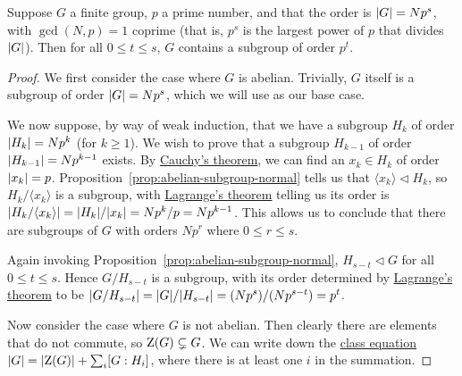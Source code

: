 \begin{theorem}\label{thm:sylow-1}
    Suppose \(G\) a finite group, \(p\) a prime number,
    and that the order is \(\abs{G} = Np^s\),
    with \(\gcd(N,p) = 1\) coprime
    (that is, \(p^s\) is the largest power of \(p\) that divides \(\abs{G}\)).
    Then for all \(0 \leq t \leq s\),
    \(G\) contains a subgroup of order \(p^t\).
\end{theorem}
\begin{proof}
    We first consider the case where \(G\) is abelian.
    Trivially, \(G\) itself is a subgroup of order \(\abs{G} = Np^s\),
    which we will use as our base case.

    We now suppose, by way of weak induction,
    that we have a subgroup \(H_k\) of order \(\abs{H_k} = Np^k\)
    (for \(k \geq 1\)).
    We wish to prove that a subgroup \(H_{k-1}\)
    of order \(\abs{H_{k-1}} = Np^{k-1}\) exists.
    By \hyperref[thm:cauchy]{Cauchy's theorem},
    we can find an \(x_k \in H_k\) of order \(\abs{x_k} = p\).
    Proposition~\ref{prop:abelian-subgroup-normal}
    tells us that \(\langle x_k \rangle \lhd H_k\),
    so \(H_k/\langle x_k \rangle\) is a subgroup,
    with \hyperref[thm:lagrange]{Lagrange's theorem} telling us
    its order is \(\abs{H_k/\langle x_k \rangle}
    = \abs{H_k}/\abs{x_k} = Np^k/p = Np^{k-1}\).
    This allows us to conclude that there are subgroups of \(G\)
    with orders \(Np^r\) where \(0 \leq r \leq s\).

    Again invoking Proposition~\ref{prop:abelian-subgroup-normal},
    \(H_{s-t} \lhd G\) for all \(0 \leq t \leq s\).
    Hence \(G/H_{s-t}\) is a subgroup,
    with its order determined by \hyperref[thm:lagrange]{Lagrange's theorem}
    to be \(\abs{G/H_{s-t}} = \abs{G}/\abs{H_{s-t}}
    = (Np^s)/(Np^{s-t}) = p^t\).

    \medskip

    Now consider the case where \(G\) is not abelian.
    Then clearly there are elements that do not commute,
    so \(\operatorname{Z}(G) \subsetneq G\).
    We can write down the \hyperref[thm:class-equation]{class equation}
    \(\abs{G} = \abs{\operatorname{Z}(G)} + \sum_i [G:H_i]\),
    where there is at least one \(i\) in the summation.


\end{proof}

